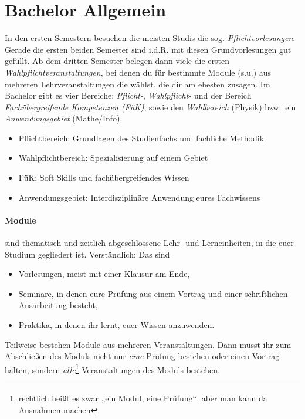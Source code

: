 \section{Bachelor Allgemein}
In den ersten Semestern besuchen die meisten Studis die sog. \emph{Pflichtvorlesungen}. Gerade die ersten beiden Semester sind i.d.R. mit diesen Grundvorlesungen gut gefüllt. Ab dem dritten Semester belegen dann viele die ersten \emph{Wahlpflichtveranstaltungen}, bei denen du für bestimmte Module (s.u.) aus mehreren Lehrveranstaltungen die wählst, die dir am ehesten zusagen. Im Bachelor gibt es vier Bereiche: \emph{Pflicht-}, \emph{Wahlpflicht-} und der Bereich \emph{Fachübergreifende Kompetenzen (FüK)}, sowie den \emph{Wahlbereich} (Physik) bzw.~ein \emph{Anwendungsgebiet} (Mathe/Info).

\begin{itemize}
	\item Pflichtbereich: Grundlagen des Studienfachs und fachliche Methodik
	\item Wahlpflichtbereich: Spezialisierung auf einem Gebiet
	\item FüK: Soft Skills und fachübergreifendes Wissen
	\item Anwendungsgebiet: Interdisziplinäre Anwendung eures Fachwissens
\end{itemize}

\paragraph*{Module} sind \glqq{}thematisch und zeitlich abgeschlossene Lehr- und Lerneinheiten\grqq{}, in die euer Studium gegliedert ist. Verständlich: Das sind

\begin{itemize}
	\item Vorlesungen, meist mit einer Klausur am Ende,
	\item Seminare, in denen eure Prüfung aus einem Vortrag und einer schriftlichen Ausarbeitung besteht,
	\item Praktika, in denen ihr lernt, euer Wissen anzuwenden.
\end{itemize}

Teilweise bestehen Module aus mehreren Veranstaltungen. Dann müsst ihr zum Abschließen des Moduls nicht nur \textit{eine} Prüfung bestehen oder einen Vortrag halten, sondern \textit{alle}\footnote{rechtlich heißt es zwar „ein Modul, eine Prüfung“, aber man kann da Ausnahmen machen} Veranstaltungen des Moduls bestehen.


